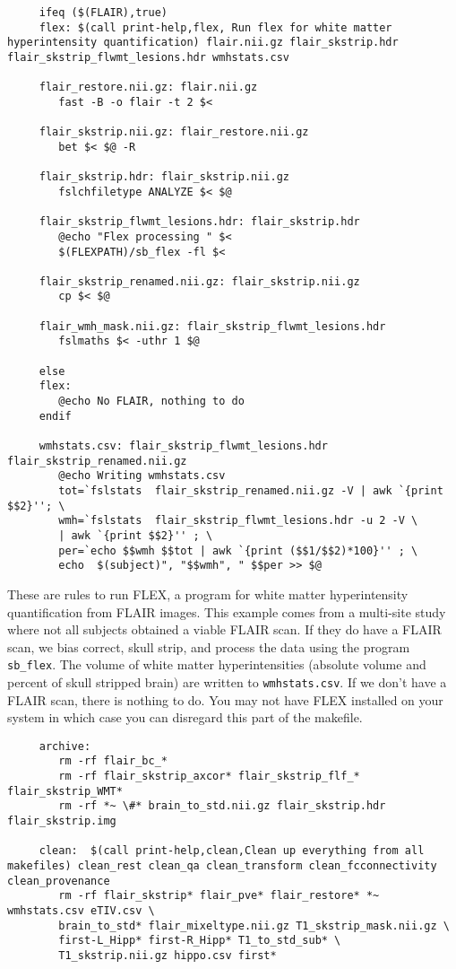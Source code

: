 \begin{lstlisting}
	 ifeq ($(FLAIR),true)
	 flex: $(call print-help,flex, Run flex for white matter hyperintensity quantification) flair.nii.gz flair_skstrip.hdr flair_skstrip_flwmt_lesions.hdr wmhstats.csv

	 flair_restore.nii.gz: flair.nii.gz
		fast -B -o flair -t 2 $<

	 flair_skstrip.nii.gz: flair_restore.nii.gz
		bet $< $@ -R

	 flair_skstrip.hdr: flair_skstrip.nii.gz 
		fslchfiletype ANALYZE $< $@

	 flair_skstrip_flwmt_lesions.hdr: flair_skstrip.hdr
		@echo "Flex processing " $< 
		$(FLEXPATH)/sb_flex -fl $< 

	 flair_skstrip_renamed.nii.gz: flair_skstrip.nii.gz
		cp $< $@

	 flair_wmh_mask.nii.gz: flair_skstrip_flwmt_lesions.hdr
		fslmaths $< -uthr 1 $@

	 else
	 flex:
		@echo No FLAIR, nothing to do
	 endif

	 wmhstats.csv: flair_skstrip_flwmt_lesions.hdr flair_skstrip_renamed.nii.gz
		@echo Writing wmhstats.csv 
		tot=`fslstats  flair_skstrip_renamed.nii.gz -V | awk `{print $$2}''; \
		wmh=`fslstats  flair_skstrip_flwmt_lesions.hdr -u 2 -V \
		| awk `{print $$2}'' ; \
		per=`echo $$wmh $$tot | awk `{print ($$1/$$2)*100}'' ; \
		echo  $(subject)", "$$wmh", " $$per >> $@ 
\end{lstlisting}

These are rules to run FLEX, a program for white matter hyperintensity
quantification from FLAIR images. This example comes from a multi-site
study where not all subjects obtained a viable FLAIR scan. If they do
have a FLAIR scan, we bias correct, skull strip, and process the data
using the program \texttt{sb_flex}.  The volume of white
matter hyperintensities (absolute volume and percent of skull stripped
brain) are written to \texttt{wmhstats.csv}. If we don't have a FLAIR
scan, there is nothing to do. You may not have FLEX installed on your
system in which case you can disregard this part of the makefile.


\begin{lstlisting}
	 archive:
		rm -rf flair_bc_*
		rm -rf flair_skstrip_axcor* flair_skstrip_flf_* flair_skstrip_WMT*
		rm -rf *~ \#* brain_to_std.nii.gz flair_skstrip.hdr flair_skstrip.img

	 clean:  $(call print-help,clean,Clean up everything from all makefiles) clean_rest clean_qa clean_transform clean_fcconnectivity clean_provenance
		rm -rf flair_skstrip* flair_pve* flair_restore* *~ wmhstats.csv eTIV.csv \
		brain_to_std* flair_mixeltype.nii.gz T1_skstrip_mask.nii.gz \
		first-L_Hipp* first-R_Hipp* T1_to_std_sub* \
		T1_skstrip.nii.gz hippo.csv first*
\end{lstlisting}

